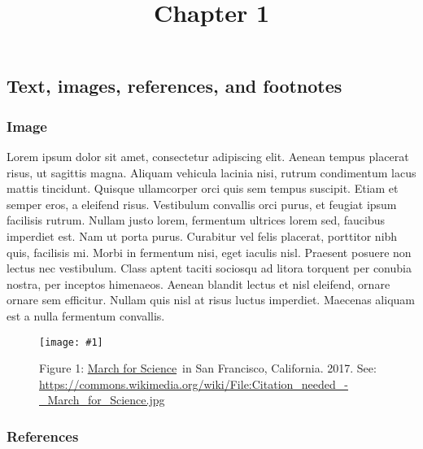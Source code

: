 \documentclass{article}
\newlength{\imgwidth}
\newcommand\scaledgraphics[2]{%
                
\settowidth{\imgwidth}{\texttt{[image: \#1]}}%
                
\setlength{\imgwidth}{\minof{\imgwidth}{#2\textwidth}}%
                
\texttt{[image: \#1]}%
                
}
\begin{document}
\title{Chapter 1}

\maketitle


\subsection{Text, images, references, and footnotes}\label{H5353869}



\subsubsection{Image}\label{H6448135}



Lorem ipsum dolor sit amet, consectetur adipiscing elit. Aenean tempus placerat risus, ut sagittis magna. Aliquam vehicula lacinia nisi, rutrum condimentum lacus mattis tincidunt. Quisque ullamcorper orci quis sem tempus suscipit. Etiam et semper eros, a eleifend risus. Vestibulum convallis orci purus, et feugiat ipsum facilisis rutrum. Nullam justo lorem, fermentum ultrices lorem sed, faucibus imperdiet est. Nam ut porta purus. Curabitur vel felis placerat, porttitor nibh quis, facilisis mi. Morbi in fermentum nisi, eget iaculis nisl. Praesent posuere non lectus nec vestibulum. Class aptent taciti sociosqu ad litora torquent per conubia nostra, per inceptos himenaeos. Aenean blandit lectus et nisl eleifend, ornare ornare sem efficitur. Nullam quis nisl at risus luctus imperdiet. Maecenas aliquam est a nulla fermentum convallis.

\begin{figure}
\scaledgraphics{fb7c0a1e-b728-4885-adbb-1cae4348efa6.jpg}{1}
\caption*{Figure 1: \href{https://en.wikipedia.org/wiki/March_for_Science}{March for Science} in San Francisco, California. 2017. See: \href{https://commons.wikimedia.org/wiki/File:Citation_needed_-_March_for_Science.jpg}{https://commons.wikimedia.org/wiki/File:Citation\_needed\_-\_March\_for\_Science.jpg}}\label{F64353661}
\end{figure}


\subsubsection{References}\label{H153323}
\end{document}
